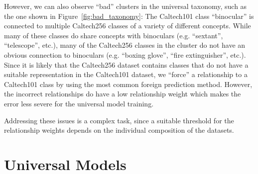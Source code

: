 However, we can also observe \enquote{bad} clusters in the universal taxonomy,
such as the one shown in Figure~\ref{fig:bad_taxonomy}:
The Caltech101 class \enquote{binocular} is connected to multiple Caltech256 classes
of a variety of different concepts.
While many of these classes do share concepts with binoculars (e.g. \enquote{sextant}, \enquote{telescope}, etc.),
many of the Caltech256 classes in the cluster do not have an obvious connection to binoculars
(e.g. \enquote{boxing glove}, \enquote{fire extinguisher}, etc.).
Since it is likely that the Caltech256 dataset contains classes that do not have a suitable representation in the Caltech101 dataset,
we \enquote{force} a relationship to a Caltech101 class by using the most common foreign prediction method.
However, the incorrect relationships do have a low relationship weight which makes
the error less severe for the universal model training.

Addressing these issues is a complex task, since a suitable threshold for the relationship weights
depends on the individual composition of the datasets.


\section{Universal Models}

